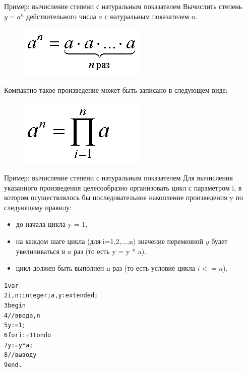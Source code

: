 \documentclass{beamer}
\begin{document}
\begin{frame}{Пример: вычисление степени с натуральным показателем}
Вычислить степень $y = a^n$ действительного числа $a$ с натуральным показателем $n$.
\begin{figure}[h]
\centering
\includegraphics[scale=0.5]{images/lec04-pic05.png}
\end{figure}
Компактно такое произведение может быть записано в следующем виде:
\begin{figure}[h]
\centering
\includegraphics[scale=0.5]{images/lec04-pic06.png}
\end{figure}
\end{frame}

\begin{frame}[fragile]{Пример: вычисление степени с натуральным показателем}
Для вычисления указанного произведения целесообразно организовать цикл с параметром i, в котором осуществлялось бы последовательное накопление произведения y по следующему правилу: 
\begin{itemize}
\item до начала цикла y = 1, 
\item на каждом шаге цикла (для i=1,2,...,n) значение переменной $y$ будет увеличиваться в $a$ раз (то есть y = y * a). 
\item цикл должен быть выполнен n раз (то есть условие цикла $i<=n$).
\end{itemize}
\begin{alltt}
1 var
2   i, n: integer; a, y : extended;
3 begin
4   //ввод a, n
5   y := 1;
6   for i := 1 to n do
7     y := y * a;
8   //вывод y
9 end.
\end{alltt}
\end{frame}
\end{document}
